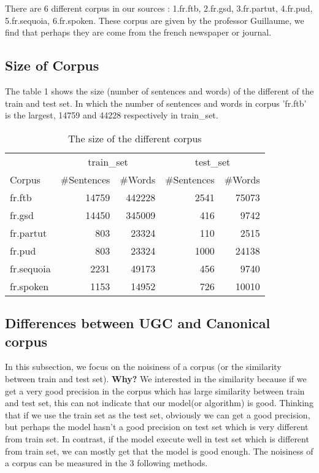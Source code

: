 \documentclass{article}
\begin{document}
There are 6 different corpus in our sources : 1.fr.ftb, 2.fr.gsd, 3.fr.partut, 4.fr.pud, 5.fr.sequoia, 6.fr.spoken. These corpus are given by the professor Guillaume, we find that perhaps they are come from the french \textsf{newspaper}  or \textsf{journal}.

\subsection{Size of Corpus} 
The table 1 shows the size (number of sentences and words) of the different of the train and test set. In which the number of sentences and words in corpus 'fr.ftb' is the largest, 14759 and 44228 respectively in train\_set. 

\begin{table}[h]
    \caption{The size of the different corpus}
    \vspace{5pt}
    \centering
    
\begin{tabular}{|l|rr|rr|}
\hline
\multicolumn{1}{|c|}{\ } & \multicolumn{2}{c|}{train\_set} & \multicolumn{2}{c|}{test\_set}\\ 
\cline{2-5}
Corpus & \#Sentences & \#Words & \#Sentences & \#Words\\
\hline
fr.ftb     & 14759 & 442228 & 2541 & 75073 \\
fr.gsd     & 14450 & 345009 & 416  & 9742\\
fr.partut  & 803   & 23324  & 110  & 2515\\
fr.pud     & 803   & 23324  & 1000 & 24138\\
fr.sequoia & 2231  & 49173  & 456  & 9740\\
fr.spoken  & 1153  & 14952  & 726  & 10010\\
\hline
\end{tabular}
\end{table}


\subsection{Differences between UGC and Canonical corpus}
In this subsection, we focus on the noisiness of a corpus (or the similarity between train and test set).  \textbf{Why?} We interested in the similarity because if we get a very good precision in the corpus which has large similarity between train and test set, this can not indicate that our model(or algorithm) is good. Thinking that if we use the train set as the test set, obviously we can get a good precision, but perhaps the model hasn't a good precision on test set which is very different from train set. In contrast, if the model execute well in test set which is different from train set, we can mostly get that the model is good enough. The noisiness of a corpus can be measured in the 3 following methods.
\end{document}
